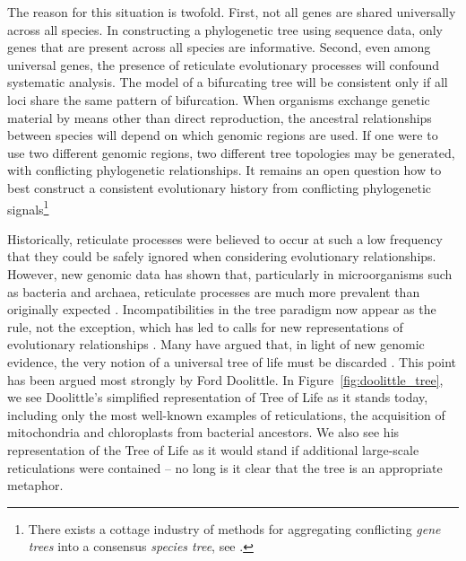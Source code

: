 The reason for this situation is twofold.
First, not all genes are shared universally across all species.
In constructing a phylogenetic tree using sequence data, only genes that are present across all species are informative.
Second, even among universal genes, the presence of reticulate evolutionary processes will confound systematic analysis.
The model of a bifurcating tree will be consistent only if all loci share the same pattern of bifurcation.
When organisms exchange genetic material by means other than direct reproduction, the ancestral relationships between species will depend on which genomic regions are used.
If one were to use two different genomic regions, two different tree topologies may be generated, with conflicting phylogenetic relationships.
It remains an open question how to best construct a consistent evolutionary history from conflicting phylogenetic signals\footnote{There exists a cottage industry of methods for aggregating conflicting \emph{gene trees} into a consensus \emph{species tree}, see \cite{Maddison:1997ew}.}

Historically, reticulate processes were believed to occur at such a low frequency that they could be safely ignored when considering evolutionary relationships.
However, new genomic data has shown that, particularly in microorganisms such as bacteria and archaea, reticulate processes are much more prevalent than originally expected \cite{Ochman:2000dr}.
Incompatibilities in the tree paradigm now appear as the rule, not the exception, which has led to calls for new representations of evolutionary relationships \cite{Doolittle:1999,Doolittle:2006}.
Many have argued that, in light of new genomic evidence, the very notion of a universal tree of life must be discarded \cite{Koonin:2008bt,Koonin:2008tj}.
This point has been argued most strongly by Ford Doolittle.
In Figure~\ref{fig:doolittle_tree}, we see Doolittle's simplified representation of Tree of Life as it stands today, including only the most well-known examples of reticulations, the acquisition of mitochondria and chloroplasts from bacterial ancestors.
We also see his representation of the Tree of Life as it would stand if additional large-scale reticulations were contained -- no long is it clear that the tree is an appropriate metaphor.

